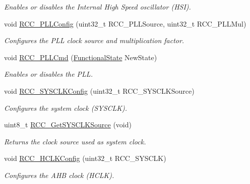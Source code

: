 \begin{DoxyCompactItemize}
\begin{DoxyCompactList}\small\item\em Enables or disables the Internal High Speed oscillator (H\+SI). \end{DoxyCompactList}\item 
void \mbox{\hyperlink{group___r_c_c___exported___functions_ga0f67634cbe721f2c42f022d2a93229c8}{R\+C\+C\+\_\+\+P\+L\+L\+Config}} (uint32\+\_\+t R\+C\+C\+\_\+\+P\+L\+L\+Source, uint32\+\_\+t R\+C\+C\+\_\+\+P\+L\+L\+Mul)
\begin{DoxyCompactList}\small\item\em Configures the P\+LL clock source and multiplication factor. \end{DoxyCompactList}\item 
void \mbox{\hyperlink{group___r_c_c___exported___functions_ga84dee53c75e58fdb53571716593c2272}{R\+C\+C\+\_\+\+P\+L\+L\+Cmd}} (\mbox{\hyperlink{group___exported__types_gac9a7e9a35d2513ec15c3b537aaa4fba1}{Functional\+State}} New\+State)
\begin{DoxyCompactList}\small\item\em Enables or disables the P\+LL. \end{DoxyCompactList}\item 
void \mbox{\hyperlink{group___r_c_c___exported___functions_ga3551a36a8f0a3dc96a74d6b939048337}{R\+C\+C\+\_\+\+S\+Y\+S\+C\+L\+K\+Config}} (uint32\+\_\+t R\+C\+C\+\_\+\+S\+Y\+S\+C\+L\+K\+Source)
\begin{DoxyCompactList}\small\item\em Configures the system clock (S\+Y\+S\+C\+LK). \end{DoxyCompactList}\item 
uint8\+\_\+t \mbox{\hyperlink{group___r_c_c___exported___functions_gaaeb32311c208b2a980841c9c884a41ea}{R\+C\+C\+\_\+\+Get\+S\+Y\+S\+C\+L\+K\+Source}} (void)
\begin{DoxyCompactList}\small\item\em Returns the clock source used as system clock. \end{DoxyCompactList}\item 
void \mbox{\hyperlink{group___r_c_c___exported___functions_ga9d0aec72e236c6cdf3a3a82dfb525491}{R\+C\+C\+\_\+\+H\+C\+L\+K\+Config}} (uint32\+\_\+t R\+C\+C\+\_\+\+S\+Y\+S\+C\+LK)
\begin{DoxyCompactList}\small\item\em Configures the A\+HB clock (H\+C\+LK). \end{DoxyCompactList}\item 

\end{DoxyCompactItemize}
